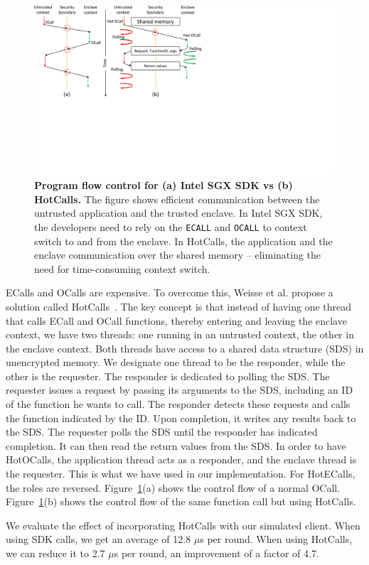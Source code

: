 \begin{figure}[t]
  \centering
    \includegraphics[trim={0 9cm 15cm 0}, clip, width=\linewidth]{chapters/ProximiTEE/images_new/hotcalls.pdf}
    \caption[Program flow control for Intel SGX SDK vs HotCalls]{\textbf{Program flow control for (a) Intel SGX SDK vs (b) HotCalls.} The figure shows efficient communication between the untrusted application and the trusted enclave. In Intel SGX SDK, the developers need to rely on the \texttt{ECALL} and \texttt{OCALL} to context switch to and from the enclave. In HotCalls, the application and the enclave communication over the shared memory -- eliminating the need for time-consuming context switch.}
    \label{fig:hotcalls}
\end{figure}

 ECalls and OCalls are expensive. To overcome this, Weisse et al. propose a solution called HotCalls~\cite{weisse2017regaining}. The key concept is that instead of having one thread that calls ECall and OCall functions, thereby entering and leaving the enclave context, we have two threads: one running in an untrusted context, the other in the enclave context. Both threads have access to a shared data structure (SDS) in unencrypted memory. We designate one thread to be the responder, while the other is the requester. The responder is dedicated to polling the SDS. The requester issues a request by passing its arguments to the SDS, including an ID of the function he wants to call. The responder detects these requests and calls the function indicated by the ID. Upon completion, it writes any results back to the SDS. The requester polls the SDS until the responder has indicated completion. It can then read the return values from the SDS. In order to have HotOCalls, the application thread acts as a responder, and the enclave thread is the requester. This is what we have used in our implementation. For HotECalls, the roles are reversed. Figure~\ref{fig:hotcalls}(a) shows the control flow of a normal OCall. Figure~\ref{fig:hotcalls}(b) shows the control flow of the same function call but using HotCalls.

We evaluate the effect of incorporating HotCalls with our simulated client. When using SDK calls, we get an average of 12.8 $\mu$s per round. When using HotCalls, we can reduce it to 2.7 $\mu$s per round, an improvement of a factor of 4.7.